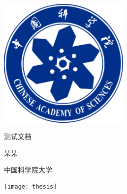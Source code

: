 \documentclass[UTF8, zihao = -4]{ctexart}
\newlength{\colpad}
\newcommand{\colwidth}{0.99\ccwd}
\newcommand{\miniwidth}{210mm}
\newcommand{\logowidth}{64mm}
\newcommand{\vertmargin}{30mm}
\begin{document}
\centering
\begin{minipage}[b][\textheight][b]{\miniwidth}
	\vspace*{\fill}\par
	\centerline{\includegraphics[width = \logowidth]{caslogo}}\par
	\vspace*{\fill}\par
\end{minipage}
\hspace{\colpad}
\begin{minipage}[b][\textheight][b]{\colwidth}
	\bfseries\linespread{1}\selectfont
	\vspace*{\vertmargin}\par
	测试文档\par\vfill
	某某{\par\vfill}中国科学院大学\par
	\vspace*{\vertmargin}\par
\end{minipage}
\hspace{\colpad}
\begin{minipage}[b][\textheight][b]{\miniwidth}
	\texttt{[image: thesis]}
\end{minipage}
\end{document}
